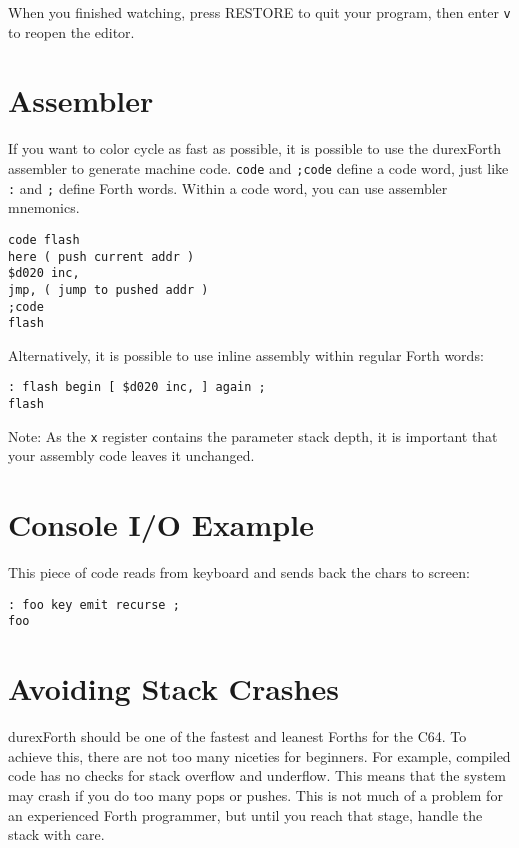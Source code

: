 When you finished watching, press \textsc{RESTORE} to quit your program, then enter \texttt{v} to reopen the editor.

\section{Assembler}

If you want to color cycle as fast as possible, it is possible to use the durexForth assembler to generate machine code. \texttt{code} and \texttt{;code} define a code word, just like \texttt{:} and \texttt{;} define Forth words. Within a code word, you can use assembler mnemonics.

\begin{verbatim}
code flash
here ( push current addr )
$d020 inc,
jmp, ( jump to pushed addr )
;code
flash
\end{verbatim}

Alternatively, it is possible to use inline assembly within regular Forth words:

\begin{verbatim}
: flash begin [ $d020 inc, ] again ;
flash
\end{verbatim}

Note: As the \texttt{x} register contains the parameter stack depth, it is important that your assembly code leaves it unchanged.

\section{Console I/O Example}

This piece of code reads from keyboard and sends back the chars to screen:

\begin{verbatim}
: foo key emit recurse ;
foo
\end{verbatim}

\section{Avoiding Stack Crashes}

durexForth should be one of the fastest and leanest Forths for the C64. To achieve this, there are
not too many niceties for beginners. For example, compiled code has no checks for stack overflow
and underflow. This means that the system may crash if you do too many pops or pushes. This is not
much of a problem for an experienced Forth programmer, but until you reach that stage, handle the
stack with care.

